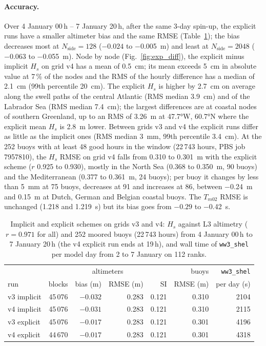 \documentclass[11pt,a4paper]{article}
\newcommand{\nside}{N_{\mathrm{side}}}
\begin{document}
\paragraph{Accuracy.} Over 4 January 00\,h -- 7 January 20\,h, after the
same 3-day spin-up, the explicit runs have a smaller altimeter bias and
the same RMSE (Table~\ref{tab:explicit}); the bias decreases most at
$\nside=128$ ($-0.024$ to \SI{-0.005}{m}) and least at $\nside=2048$
($-0.063$ to \SI{-0.055}{m}). Node by node (Fig.~\ref{fig:exp_diff}),
the explicit minus implicit $H_s$ on grid v4 has a mean of
\SI{+0.5}{cm}; its mean exceeds \SI{5}{cm} in absolute value at 7\,\% of
the nodes and the RMS of the hourly difference has a median of
\SI{2.1}{cm} (99th percentile \SI{20}{cm}). The explicit $H_s$ is higher
by \SI{2.7}{cm} on average along the swell paths of the central
Atlantic (RMS median \SI{3.9}{cm}) and of the Labrador Sea (RMS median
\SI{7.4}{cm}); the largest differences are at coastal nodes of southern
Greenland, up to an RMS of \SI{3.26}{m} at \ang{47.7}W, \ang{60.7}N where
the explicit mean $H_s$ is \SI{2.8}{m} lower. Between grids v3 and v4 the
explicit runs differ as little as the implicit ones (RMS median
\SI{3}{mm}, 99th percentile \SI{3.4}{cm}). At the 252 buoys with at least
48 good hours in the window (22\,743 hours, PBS job 7957810), the $H_s$
RMSE on grid v4 falls from 0.310 to \SI{0.301}{m} with the explicit
scheme ($r$ 0.925 to 0.930), mostly in the North Sea (0.368 to
\SI{0.350}{m}, 90 buoys) and the Mediterranean (0.377 to \SI{0.361}{m},
24 buoys);
per buoy it changes by less than \SI{5}{mm} at 75 buoys, decreases at 91
and increases at 86, between \SI{-0.24}{m} and \SI{+0.15}{m} at Dutch,
German and Belgian coastal buoys. The $T_{m02}$ RMSE is unchanged (1.218
and \SI{1.219}{s}) but its bias goes from $-0.29$ to \SI{-0.42}{s}.

\begin{table}[H]
\centering\small
\begin{tabular}{lrrrrrr}
\toprule
 & \multicolumn{4}{c}{altimeters} & buoys & \texttt{ww3\_shel} \\
run & blocks & bias (m) & RMSE (m) & SI & RMSE (m) & per day (s) \\
\midrule
v3 implicit & 45\,076 & $-0.032$ & 0.283 & 0.121 & 0.310 & 2104 \\
v4 implicit & 45\,076 & $-0.031$ & 0.283 & 0.121 & 0.310 & 2115 \\
v3 explicit & 45\,076 & $-0.017$ & 0.283 & 0.121 & 0.301 & 4196 \\
v4 explicit & 44\,670 & $-0.017$ & 0.283 & 0.121 & 0.301 & 4318 \\
\bottomrule
\end{tabular}
\caption{Implicit and explicit schemes on grids v3 and v4: $H_s$ against
L3 altimetry ($r=0.971$ for all) and 252 moored buoys (22\,743 hours)
from 4 January 00\,h to 7 January 20\,h (the v4 explicit run ends at
19\,h), and wall time of \texttt{ww3\_shel} per model day from 2 to 7
January on 112 ranks.}
\label{tab:explicit}
\end{table}
\end{document}
